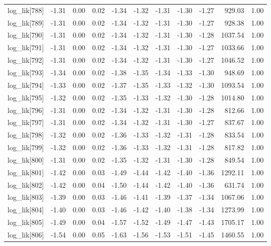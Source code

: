 \begin{table}[ht]
\begin{tabular}{rrrrrrrrrrr}
  log\_lik[788] & -1.31 & 0.00 & 0.02 & -1.34 & -1.32 & -1.31 & -1.30 & -1.27 & 929.03 & 1.00 \\ 
  log\_lik[789] & -1.31 & 0.00 & 0.02 & -1.34 & -1.32 & -1.31 & -1.30 & -1.27 & 928.38 & 1.00 \\ 
  log\_lik[790] & -1.31 & 0.00 & 0.02 & -1.34 & -1.32 & -1.31 & -1.30 & -1.28 & 1037.54 & 1.00 \\ 
  log\_lik[791] & -1.31 & 0.00 & 0.02 & -1.34 & -1.32 & -1.31 & -1.30 & -1.27 & 1033.66 & 1.00 \\ 
  log\_lik[792] & -1.31 & 0.00 & 0.02 & -1.34 & -1.32 & -1.31 & -1.30 & -1.27 & 1046.52 & 1.00 \\ 
  log\_lik[793] & -1.34 & 0.00 & 0.02 & -1.38 & -1.35 & -1.34 & -1.33 & -1.30 & 948.69 & 1.00 \\ 
  log\_lik[794] & -1.33 & 0.00 & 0.02 & -1.37 & -1.35 & -1.33 & -1.32 & -1.30 & 1093.54 & 1.00 \\ 
  log\_lik[795] & -1.32 & 0.00 & 0.02 & -1.35 & -1.33 & -1.32 & -1.30 & -1.28 & 1014.80 & 1.00 \\ 
  log\_lik[796] & -1.31 & 0.00 & 0.02 & -1.34 & -1.32 & -1.31 & -1.30 & -1.28 & 812.66 & 1.00 \\ 
  log\_lik[797] & -1.31 & 0.00 & 0.02 & -1.34 & -1.32 & -1.31 & -1.30 & -1.27 & 837.67 & 1.00 \\ 
  log\_lik[798] & -1.32 & 0.00 & 0.02 & -1.36 & -1.33 & -1.32 & -1.31 & -1.28 & 833.54 & 1.00 \\ 
  log\_lik[799] & -1.32 & 0.00 & 0.02 & -1.36 & -1.33 & -1.32 & -1.31 & -1.28 & 817.82 & 1.00 \\ 
  log\_lik[800] & -1.31 & 0.00 & 0.02 & -1.35 & -1.32 & -1.31 & -1.30 & -1.28 & 849.54 & 1.00 \\ 
  log\_lik[801] & -1.42 & 0.00 & 0.03 & -1.49 & -1.44 & -1.42 & -1.40 & -1.36 & 1292.11 & 1.00 \\ 
  log\_lik[802] & -1.42 & 0.00 & 0.04 & -1.50 & -1.44 & -1.42 & -1.40 & -1.36 & 631.74 & 1.00 \\ 
  log\_lik[803] & -1.39 & 0.00 & 0.03 & -1.46 & -1.41 & -1.39 & -1.37 & -1.34 & 1067.06 & 1.00 \\ 
  log\_lik[804] & -1.40 & 0.00 & 0.03 & -1.46 & -1.42 & -1.40 & -1.38 & -1.34 & 1273.99 & 1.00 \\ 
  log\_lik[805] & -1.49 & 0.00 & 0.04 & -1.57 & -1.52 & -1.49 & -1.47 & -1.43 & 1705.17 & 1.00 \\ 
  log\_lik[806] & -1.54 & 0.00 & 0.05 & -1.63 & -1.56 & -1.53 & -1.51 & -1.45 & 1460.55 & 1.00 \\ 

\end{tabular}
\end{table}
